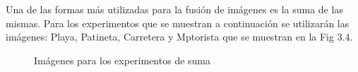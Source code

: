 Una de las formas m\'as utilizadas para la fusi\'on de im\'agenes es la suma de las mismas. Para los experimentos que se muestran a continuaci\'on se utilizar\'an las im\'agenes: Playa, Patineta, Carretera y Mptorista que se muestran en la Fig 3.4.

\begin{figure}
	\begin{center}
		\caption{Im\'agenes para los experimentos de suma}
	\end{center}
\end{figure}

